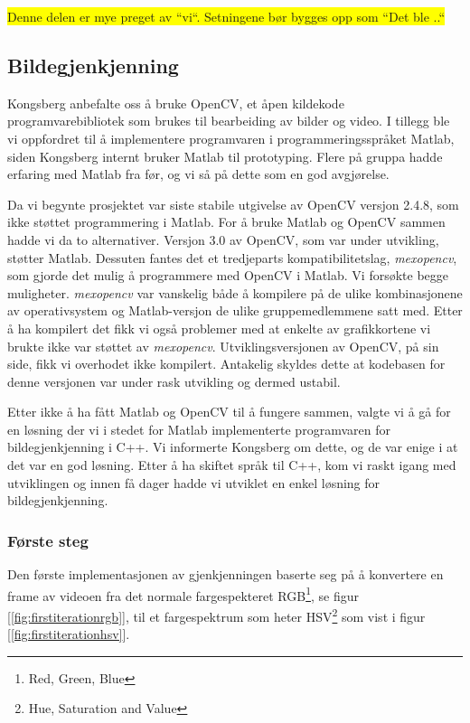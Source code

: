 \colorbox{yellow}{Denne delen er mye preget av ``vi``. Setningene bør bygges opp som ``Det ble ..``}

\subsection{Bildegjenkjenning}

Kongsberg anbefalte oss å bruke OpenCV, et åpen kildekode programvarebibliotek som brukes til bearbeiding av bilder og video. I tillegg ble vi oppfordret til å implementere programvaren i programmeringsspråket Matlab, siden Kongsberg internt bruker Matlab til prototyping. Flere på gruppa hadde erfaring med Matlab fra før, og vi så på dette som en god avgjørelse.

Da vi begynte prosjektet var siste stabile utgivelse av OpenCV versjon 2.4.8, som ikke støttet programmering i Matlab. For å bruke Matlab og OpenCV sammen hadde vi da to alternativer. Versjon 3.0 av OpenCV, som var under utvikling, støtter Matlab. Dessuten fantes det et tredjeparts kompatibilitetslag, \emph{mexopencv}, som gjorde det mulig å programmere med OpenCV i Matlab. Vi forsøkte begge muligheter. \emph{mexopencv} var vanskelig både å kompilere på de ulike kombinasjonene av operativsystem og Matlab-versjon de ulike gruppemedlemmene satt med. Etter å ha kompilert det fikk vi også problemer med at enkelte av grafikkortene vi brukte ikke var støttet av \emph{mexopencv}. Utviklingsversjonen av OpenCV, på sin side, fikk vi overhodet ikke kompilert. Antakelig skyldes dette at kodebasen for denne versjonen var under rask utvikling og dermed ustabil.

Etter ikke å ha fått Matlab og OpenCV til å fungere sammen, valgte vi å gå for en løsning der vi i stedet for Matlab implementerte programvaren for bildegjenkjenning i C++. Vi informerte Kongsberg om dette, og de var enige i at det var en god løsning. Etter å ha skiftet språk til C++, kom vi raskt igang med utviklingen og innen få dager hadde vi utviklet en enkel løsning for bildegjenkjenning.

\subsubsection{Første steg}

Den første implementasjonen av gjenkjenningen baserte seg på å konvertere en frame av videoen fra det normale fargespekteret RGB\footnote{Red, Green, Blue}, se figur [\ref{fig:firstiterationrgb}], til et fargespektrum som heter HSV\footnote{Hue, Saturation and Value} som vist i figur [\ref{fig:firstiterationhsv}].

